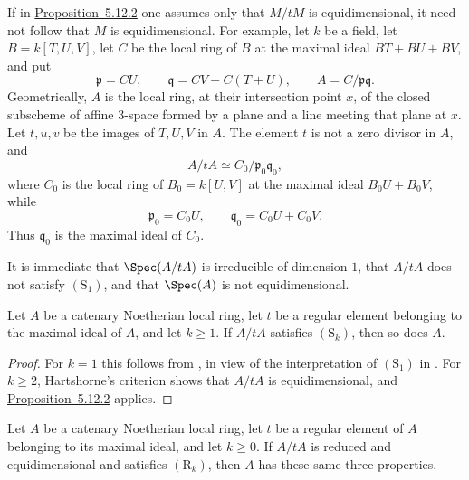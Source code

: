 \begin{remark}[5.12.3]
\label{IV.5.12.3}
If in {\hyperlink{ega4.c04.prop.5-12-2}{Proposition~5.12.2}} one assumes only that $M/tM$ is
equidimensional, it need not follow that $M$ is
equidimensional.  For example, let $k$ be a field, let
$B=k[T,U,V]$, let $C$ be the local ring of $B$ at the maximal
ideal $BT+BU+BV$, and put
\[
  \mathfrak p=CU,\qquad
  \mathfrak q=CV+C(T+U),\qquad
  A=C/\mathfrak p\mathfrak q.
\]
Geometrically, $A$ is the local ring, at their intersection
point $x$, of the closed subscheme of affine $3$-space formed by
a plane and a line meeting that plane at $x$.  Let $t,u,v$ be the
images of $T,U,V$ in $A$.  The element $t$ is not a zero divisor
in $A$, and
\[
  A/tA\simeq C_0/\mathfrak p_0\mathfrak q_0,
\]
where $C_0$ is the local ring of $B_0=k[U,V]$ at the maximal
ideal $B_0U+B_0V$, while
\[
  \mathfrak p_0=C_0U,\qquad
  \mathfrak q_0=C_0U+C_0V.
\]
  Thus $\mathfrak q_0$ is the maximal ideal of $C_0$.


  It is
immediate that $\Spec(A/tA)$ is irreducible of dimension $1$,
that $A/tA$ does not satisfy $(\mathrm S_1)$, and that
$\Spec(A)$ is not equidimensional.
\end{remark}

\begin{corollary}[5.12.4]
\label{IV.5.12.4}
Let $A$ be a catenary Noetherian local ring, let $t$ be a regular
element belonging to the maximal ideal of $A$, and let $k\geq1$.
If $A/tA$ satisfies $(\mathrm S_k)$, then so does $A$.
\end{corollary}

\begin{proof}
For $k=1$ this follows from , in view of the
interpretation of $(\mathrm S_1)$ in .  For
$k\geq2$, Hartshorne's criterion  shows that
$A/tA$ is equidimensional, and {\hyperlink{ega4.c04.prop.5-12-2}{Proposition~5.12.2}} applies.
\end{proof}

\begin{proposition}[5.12.5]
\label{IV.5.12.5}
Let $A$ be a catenary Noetherian local ring, let $t$ be a regular
element of $A$ belonging to its maximal ideal, and let $k\geq0$.
If $A/tA$ is reduced and equidimensional and satisfies
$(\mathrm R_k)$, then $A$ has these same three properties.
\end{proposition}


